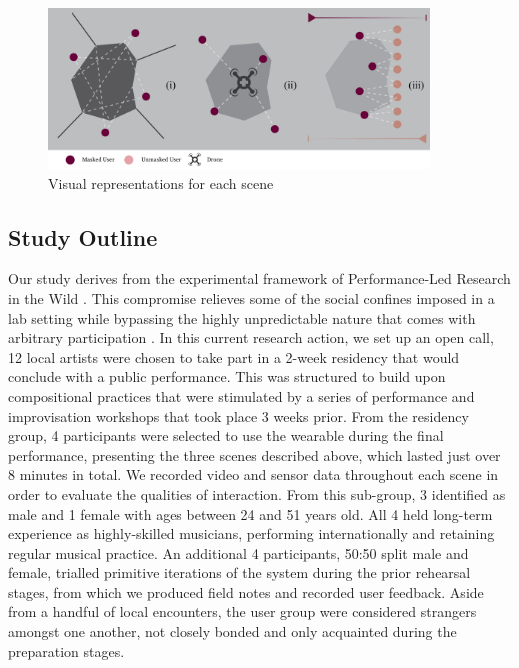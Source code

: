 \begin{figure}[!h]
\centering
\includegraphics[width=0.9\textwidth,keepaspectratio]{Chapters/Figures/adse_ess/scenes_w_keycode.png}
{\caption{Visual representations for each scene}\label{fig1:structure}}
\end{figure}

\subsection{Study Outline}

Our study derives from the experimental framework of Performance-Led Research in the Wild \citep{benford_performance-led_2013}. This compromise relieves some of the social confines imposed in a lab setting while bypassing the highly unpredictable nature that comes with arbitrary participation \citep{heron_par_2017}. In this current research action, we set up an open call, 12 local artists were chosen to take part in a 2-week residency that would conclude with a public performance. This was structured to build upon compositional practices that were stimulated by a series of performance and improvisation workshops that took place 3 weeks prior. From the residency group, 4 participants were selected to use the wearable during the final performance, presenting the three scenes described above, which lasted just over 8 minutes in total. We recorded video and sensor data throughout each scene in order to evaluate the qualities of interaction. From this sub-group, 3 identified as male and 1 female with ages between 24 and 51 years old. All 4 held long-term experience as highly-skilled musicians, performing internationally and retaining regular musical practice. An additional 4 participants, 50:50 split male and female, trialled primitive iterations of the system during the prior rehearsal stages, from which we produced field notes and recorded user feedback. Aside from a handful of local encounters, the user group were considered strangers amongst one another, not closely bonded and only acquainted during the preparation stages.

